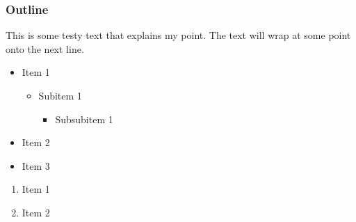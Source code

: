 \begin{frame}
	\frametitle{Outline}
	This is some testy text that explains my point. The text will wrap at some point onto the next line.

	\begin{itemize}
		\item{Item 1}
		\begin{itemize}
      \item{Subitem 1}
      \begin{itemize}
        \item{Subsubitem 1}
      \end{itemize}
    \end{itemize}
		\item{Item 2}
		\item{Item 3}
	\end{itemize}

  \begin{enumerate}
    \item{Item 1}
    \item{Item 2}
  \end{enumerate}



\end{frame}